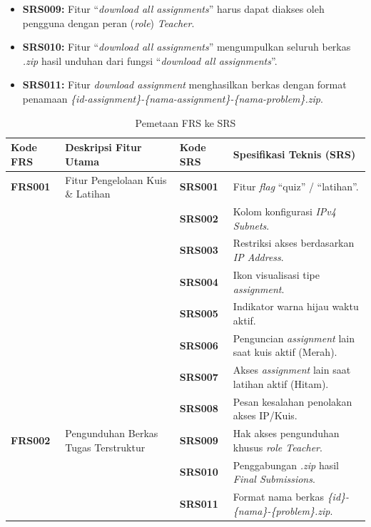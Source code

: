 \begin{itemize}
    \item \textbf{SRS009:} Fitur ``\textit{download all assignments}'' harus dapat diakses oleh pengguna dengan peran (\textit{role}) \textit{Teacher}.
    
    \item \textbf{SRS010:} Fitur ``\textit{download all assignments}'' mengumpulkan seluruh berkas \textit{.zip} hasil unduhan dari fungsi ``\textit{download all assignments}''.
    
    \item \textbf{SRS011:} Fitur \textit{download assignment} menghasilkan berkas dengan format penamaan \textit{\{id-assignment\}-\{nama-assignment\}-\{nama-problem\}.zip}.
\end{itemize}   

\begin{table}[H]
    \centering
    \caption{Pemetaan FRS ke SRS}
    \label{tab:pemetaan_frs_srs}
    \small
    \begin{tabular}{l p{4.5cm} l p{5cm}}
        \toprule
        \textbf{Kode FRS} & \textbf{Deskripsi Fitur Utama} & \textbf{Kode SRS} & \textbf{Spesifikasi Teknis (SRS)} \\
        \midrule
        \textbf{FRS001} & Fitur Pengelolaan Kuis \& Latihan & \textbf{SRS001} & Fitur \textit{flag} ``quiz'' / ``latihan''. \\
                        & & \textbf{SRS002} & Kolom konfigurasi \textit{IPv4 Subnets}. \\
                        & & \textbf{SRS003} & Restriksi akses berdasarkan \textit{IP Address}. \\
                        & & \textbf{SRS004} & Ikon visualisasi tipe \textit{assignment}. \\
                        & & \textbf{SRS005} & Indikator warna hijau waktu aktif. \\
                        & & \textbf{SRS006} & Penguncian \textit{assignment} lain saat kuis aktif (Merah). \\
                        & & \textbf{SRS007} & Akses \textit{assignment} lain saat latihan aktif (Hitam). \\
                        & & \textbf{SRS008} & Pesan kesalahan penolakan akses IP/Kuis. \\
        \midrule
        \textbf{FRS002} & Pengunduhan Berkas Tugas Terstruktur & \textbf{SRS009} & Hak akses pengunduhan khusus \textit{role Teacher}. \\
                        & & \textbf{SRS010} & Penggabungan \textit{.zip} hasil \textit{Final Submissions}. \\
                        & & \textbf{SRS011} & Format nama berkas \textit{\{id\}-\{nama\}-\{problem\}.zip}. \\
        \bottomrule
    \end{tabular}
\end{table}

